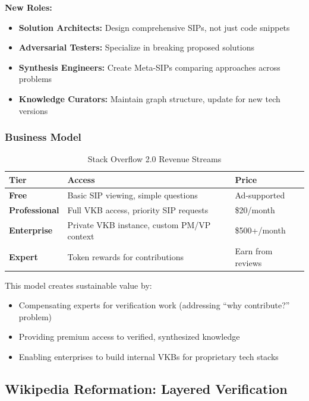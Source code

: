 \documentclass[11pt,a4paper]{article}
\theoremstyle{definition}
\theoremstyle{remark}
\newcommand{\VKB}{\textsc{VKB}}
\newcommand{\SIP}{\textsc{SIP}}
\begin{document}
\begin{mdframed}[style=implementationbox, frametitle={Stack Overflow 2.0 Architecture}]
\textbf{New Roles:}
\begin{itemize}
    \item \textbf{Solution Architects:} Design comprehensive \SIP{}s, not just code snippets
    \item \textbf{Adversarial Testers:} Specialize in breaking proposed solutions
    \item \textbf{Synthesis Engineers:} Create Meta-\SIP{}s comparing approaches across problems
    \item \textbf{Knowledge Curators:} Maintain graph structure, update for new tech versions
\end{itemize}
\end{mdframed}

\subsubsection{Business Model}

\begin{table}[H]
\centering
\caption{Stack Overflow 2.0 Revenue Streams}
\begin{tabular}{@{}lp{6cm}p{4cm}@{}}
\toprule
\textbf{Tier} & \textbf{Access} & \textbf{Price} \\
\midrule
\textbf{Free} & Basic \SIP{} viewing, simple questions & Ad-supported \\
\textbf{Professional} & Full \VKB{} access, priority \SIP{} requests & \$20/month \\
\textbf{Enterprise} & Private \VKB{} instance, custom PM/VP context & \$500+/month \\
\textbf{Expert} & Token rewards for contributions & Earn from reviews \\
\bottomrule
\end{tabular}
\end{table}

This model creates sustainable value by:
\begin{itemize}
    \item Compensating experts for verification work (addressing ``why contribute?'' problem)
    \item Providing premium access to verified, synthesized knowledge
    \item Enabling enterprises to build internal \VKB{}s for proprietary tech stacks
\end{itemize}

\subsection{Wikipedia Reformation: Layered Verification}
\end{document}
